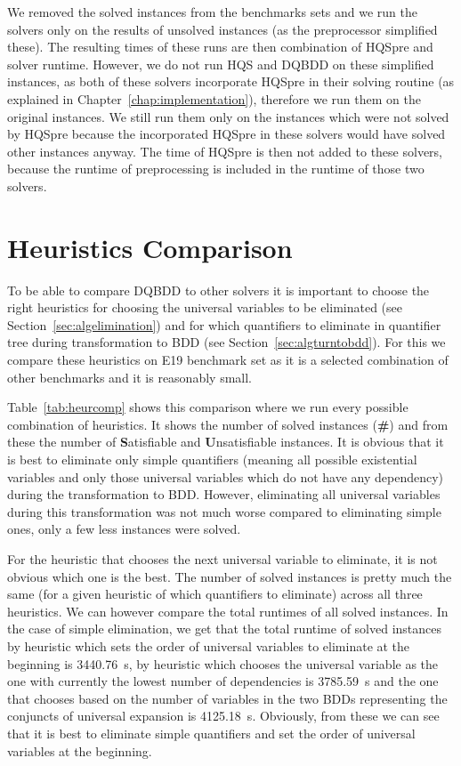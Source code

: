 \documentclass[
  digital, %
  color,
  twoside, %
  table,   %
  nolof,     %
  nolot,     %
]{fithesis3}
\theoremstyle{definition}
\theoremstyle{remark}
\begin{document}
We removed the solved instances from the benchmarks sets and we run the solvers only on the results of unsolved instances (as the preprocessor simplified these). The resulting times of these runs are then combination of HQSpre and solver runtime. However, we do not run HQS and DQBDD on these simplified instances, as both of these solvers incorporate HQSpre in their solving routine (as explained in Chapter~\ref{chap:implementation}), therefore we run them on the original instances. We still run them only on the instances which were not solved by HQSpre because the incorporated HQSpre in these solvers would have solved other instances anyway. The time of HQSpre is then not added to these solvers, because the runtime of preprocessing is included in the runtime of those two solvers.

\section{Heuristics Comparison}
To be able to compare DQBDD to other solvers it is important to choose the right heuristics for choosing the universal variables to be eliminated (see Section~\ref{sec:algelimination}) and for which quantifiers to eliminate in quantifier tree during transformation to BDD (see Section~\ref{sec:algturntobdd}). For this we compare these heuristics on E19 benchmark set as it is a selected combination of other benchmarks and it is reasonably small. 

Table~\ref{tab:heurcomp} shows this comparison where we run every possible combination of heuristics. It shows the number of solved instances (\textbf{\#}) and from these the number of \textbf{S}atisfiable and \textbf{U}n\-sa\-ti\-sfi\-able instances. It is obvious that it is best to eliminate only simple quantifiers (meaning all possible existential variables and only those universal variables which do not have any dependency) during the transformation to BDD. However, eliminating all universal variables during this transformation was not much worse compared to eliminating simple ones, only a few less instances were solved.

For the heuristic that chooses the next universal variable to eliminate, it is not obvious which one is the best. The number of solved instances is pretty much the same (for a given heuristic of which quantifiers to eliminate) across all three heuristics. We can however compare the total runtimes of all solved instances. In the case of simple elimination, we get that the total runtime of solved instances by heuristic which sets the order of universal variables to eliminate at the beginning is \SI{3440.76}{s}, by heuristic which chooses the universal variable as the one with currently the lowest number of dependencies is \SI{3785.59}{s} and the one that chooses based on the number of variables in the two BDDs representing the conjuncts of universal expansion is \SI{4125.18}{s}. Obviously, from these we can see that it is best to eliminate simple quantifiers and set the order of universal variables at the beginning.
\end{document}
